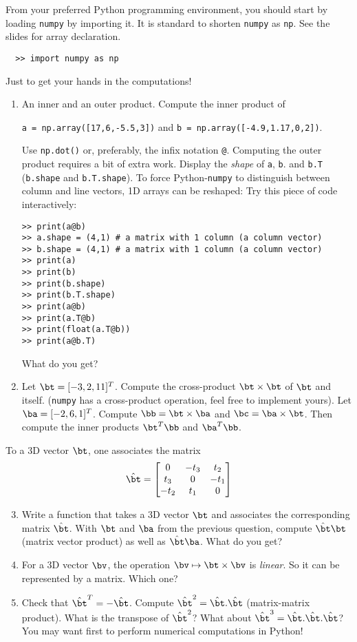 \documentclass[a4paper,10pt]{article}
\newcommand{\numpy}{\texttt{numpy}}
\begin{document}
From your preferred Python programming environment, you should start by loading \texttt{numpy} by importing it. It is standard to shorten \texttt{numpy} as \texttt{np}.
See the slides for array declaration.
\begin{verbatim}
  >> import numpy as np
\end{verbatim}
Just to get your hands in the computations! 
\begin{enumerate}
  \item An inner and an outer product.  Compute the inner product of
   \begin{center}
     \texttt{a = np.array([17,6,-5.5,3])} and \texttt{b = np.array([-4.9,1.17,0,2])}.
   \end{center}
   Use \texttt{np.dot()} or, preferably, the infix notation \texttt{@}. Computing the outer product requires a bit of extra work. Display the \emph{shape} of \texttt{a}, \texttt{b}.
   and \texttt{b.T} (\texttt{b.shape} and \texttt{b.T.shape}). To force Python-\numpy{} to distinguish between column and line vectors, 1D arrays can be reshaped: Try this piece of code interactively:
   \vspace{-3mm}
   \begin{verbatim}
>> print(a@b)
>> a.shape = (4,1) # a matrix with 1 column (a column vector)
>> b.shape = (4,1) # a matrix with 1 column (a column vector)
>> print(a)
>> print(b)
>> print(b.shape)
>> print(b.T.shape)
>> print(a@b)
>> print(a.T@b)
>> print(float(a.T@b))
>> print(a@b.T)
   \end{verbatim}\vspace{-6mm}
  What do you get?
  \item Let $\bt = [-3,2,11]^T$. Compute the cross-product $\bt\times \bt$ of $\bt$ and itself. (\numpy{} has a cross-product operation, feel free to implement yours).
  Let $\ba = [-2,6,1]^T$. Compute $\bb = \bt\times \ba$ and $\bc = \ba\times \bt$. Then compute the inner products $\bt^T\bb$ and $\ba^T \bb$. 
\end{enumerate}  
To a 3D vector $\bt$, one associates the matrix
$$
\hat{\bt} = \begin{bmatrix}
  0 & -t_3 & t_2\\
  t_3& 0 & -t_1\\
  -t_2 & t_1 & 0
\end{bmatrix}
$$
\begin{enumerate}
	\setcounter{enumi}{2}
  \item Write a function that takes a 3D vector $\bt$ and associates the corresponding matrix $\hat{\bt}$.
    With $\bt$ and $\ba$ from the previous question, compute $\hat{\bt}\bt$ (matrix vector product) as well as $\hat{\bt}\ba$. What do you get? 
  \item For a 3D vector $\bv$, the operation $\bv\mapsto \bt\times \bv$ is \emph{linear}. So it can be represented by a matrix. Which one? 
  \item Check that $\hat{\bt}^T = -\hat{\bt}$. Compute  $\hat{\bt}^2 = \hat{\bt}.\hat{\bt}$ (matrix-matrix product). What is the transpose of $\hat{\bt}^2$? What about $\hat{\bt}^3 = \hat{\bt}.\hat{\bt}.\hat{\bt}$?
  You may want first to perform numerical computations in Python! 
\end{enumerate}
\end{document}

